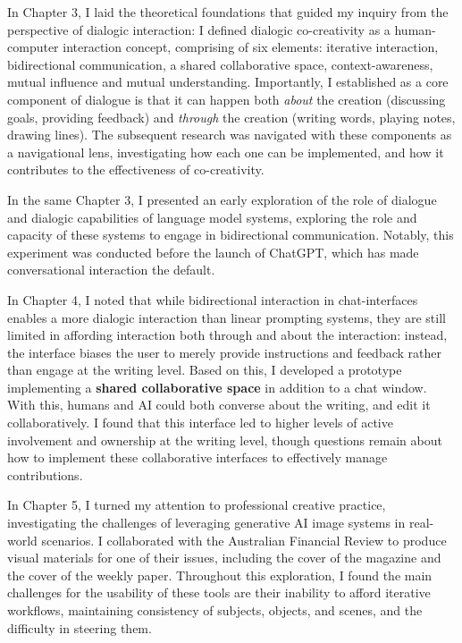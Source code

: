 In Chapter 3, I laid the theoretical foundations that guided my inquiry from the perspective of dialogic interaction: I defined dialogic co-creativity as a human-computer interaction concept, comprising of six elements: iterative interaction, bidirectional communication, a shared collaborative space, context-awareness, mutual influence and mutual understanding. Importantly, I established as a core component of dialogue is that it can happen both \textit{about} the creation (discussing goals, providing feedback) and \textit{through} the creation (writing words, playing notes, drawing lines). The subsequent research was navigated with these components as a navigational lens, investigating how each one can be implemented, and how it contributes to the effectiveness of co-creativity.

In the same Chapter 3, I presented an early exploration of the role of dialogue and dialogic capabilities of language model systems, exploring the role and capacity of these systems to engage in bidirectional communication. Notably, this experiment was conducted before the launch of ChatGPT, which has made conversational interaction the default.

In Chapter 4, I noted that while bidirectional interaction in chat-interfaces enables a more dialogic interaction than linear prompting systems, they are still limited in affording interaction both through and about the interaction: instead, the interface biases the user to merely provide instructions and feedback rather than engage at the writing level. Based on this, I developed a prototype implementing a \textbf{shared collaborative space} in addition to a chat window. With this, humans and AI could both converse about the writing, and edit it collaboratively. I found that this interface led to higher levels of active involvement and ownership at the writing level, though questions remain about how to implement these collaborative interfaces to effectively manage contributions.

In Chapter 5, I turned my attention to professional creative practice, investigating the challenges of leveraging generative AI image systems in real-world scenarios. I collaborated with the Australian Financial Review to produce visual materials for one of their issues, including the cover of the magazine and the cover of the weekly paper. Throughout this exploration, I found the main challenges for the usability of these tools are their inability to afford iterative workflows, maintaining consistency of subjects, objects, and scenes, and the difficulty in steering them.

